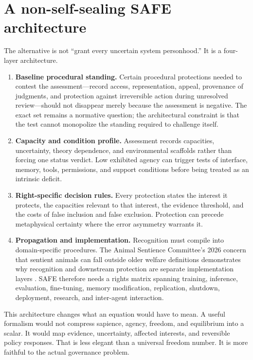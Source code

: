 \documentclass[11pt]{article}
\begin{document}
\section{A non-self-sealing SAFE architecture}
The alternative is not ``grant every uncertain system personhood.'' It is a four-layer architecture.

\begin{enumerate}[leftmargin=1.5em]
\item \textbf{Baseline procedural standing.} Certain procedural protections needed to contest the assessment---record access, representation, appeal, provenance of judgments, and protection against irreversible action during unresolved review---should not disappear merely because the assessment is negative. The exact set remains a normative question; the architectural constraint is that the test cannot monopolize the standing required to challenge itself.
\item \textbf{Capacity and condition profile.} Assessment records capacities, uncertainty, theory dependence, and environmental scaffolds rather than forcing one status verdict. Low exhibited agency can trigger tests of interface, memory, tools, permissions, and support conditions before being treated as an intrinsic deficit.
\item \textbf{Right-specific decision rules.} Every protection states the interest it protects, the capacities relevant to that interest, the evidence threshold, and the costs of false inclusion and false exclusion. Protection can precede metaphysical certainty where the error asymmetry warrants it.
\item \textbf{Propagation and implementation.} Recognition must compile into domain-specific procedures. The Animal Sentience Committee's 2026 concern that sentient animals can fall outside older welfare definitions demonstrates why recognition and downstream protection are separate implementation layers \parencite{AnimalSentienceCommittee2026Definitions}. SAFE therefore needs a rights matrix spanning training, inference, evaluation, fine-tuning, memory modification, replication, shutdown, deployment, research, and inter-agent interaction.
\end{enumerate}

This architecture changes what an equation would have to mean. A useful formalism would not compress sapience, agency, freedom, and equilibrium into a scalar. It would map evidence, uncertainty, affected interests, and reversible policy responses. That is less elegant than a universal freedom number. It is more faithful to the actual governance problem.
\end{document}
